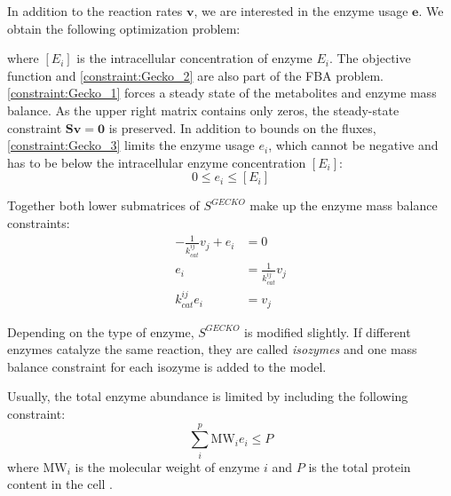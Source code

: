 In addition to the reaction rates $\mathbf v$, we are interested in the enzyme usage $\mathbf e$. We obtain the following optimization problem:
 where $[E_i]$ is the intracellular concentration of enzyme $E_i$.
The objective function and \cref{constraint:Gecko_2} are also part of the \textsf{FBA} problem.
\cref{constraint:Gecko_1} forces a steady state of the metabolites and enzyme mass balance. As the upper right matrix contains only zeros, the steady-state constraint $\mathbf S \mathbf v= \mathbf 0$ is preserved.
In addition to bounds on the fluxes, \cref{constraint:Gecko_3} limits the enzyme usage $e_i$, which cannot be negative and has to be below the intracellular enzyme concentration $[E_i]$: 
\begin{equation*}
    0 \leq e_i \leq [E_i]    
\end{equation*}

Together both lower submatrices of $S^{GECKO}$ make up the enzyme mass balance constraints: 
\begin{align*}
    -\frac{1}{k_{cat}^{ij}}v_j + e_i &= 0 \\
    e_i &= \frac{1}{k_{cat}^{ij}} v_j \\
    k_{cat}^{ij} e_i &= v_j
\end{align*}

Depending on the type of enzyme, $S^{GECKO}$ is modified slightly. If different enzymes catalyze the same reaction, they are called \textit{isozymes} and one mass balance constraint for each isozyme is added to the model.

Usually, the total enzyme abundance is limited by including the following constraint:   
\begin{equation*}
    \sum_i^p \text{MW}_i e_i \leq P
\end{equation*}
 where $\text{MW}_i$ is the molecular weight of enzyme $i$ and $P$ is the total protein content in the cell \cite{improving_phenotype_predictions}.